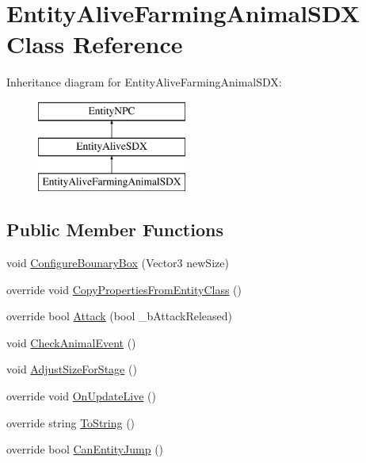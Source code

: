 \hypertarget{class_entity_alive_farming_animal_s_d_x}{}\section{Entity\+Alive\+Farming\+Animal\+S\+DX Class Reference}
\label{class_entity_alive_farming_animal_s_d_x}
Inheritance diagram for Entity\+Alive\+Farming\+Animal\+S\+DX\+:\begin{figure}[H]
\begin{center}
\leavevmode
\includegraphics[height=3.000000cm]{class_entity_alive_farming_animal_s_d_x}
\end{center}
\end{figure}
\subsection*{Public Member Functions}
\begin{DoxyCompactItemize}
\item 
void \mbox{\hyperlink{class_entity_alive_farming_animal_s_d_x_ab21718ff9ea7c49151c75dc1860be3ef}{Configure\+Bounary\+Box}} (Vector3 new\+Size)
\item 
override void \mbox{\hyperlink{class_entity_alive_farming_animal_s_d_x_a38ff8d31b3da26b1a179b4427610f880}{Copy\+Properties\+From\+Entity\+Class}} ()
\item 
override bool \mbox{\hyperlink{class_entity_alive_farming_animal_s_d_x_af1bff3e18731ed19c9435023f104c782}{Attack}} (bool \+\_\+b\+Attack\+Released)
\item 
void \mbox{\hyperlink{class_entity_alive_farming_animal_s_d_x_a13aff46204687873f3d4637585612d6e}{Check\+Animal\+Event}} ()
\item 
void \mbox{\hyperlink{class_entity_alive_farming_animal_s_d_x_a260d6bbf1a7d21fcf274e899b6347e44}{Adjust\+Size\+For\+Stage}} ()
\item 
override void \mbox{\hyperlink{class_entity_alive_farming_animal_s_d_x_a7beb1631a7f2d5b3e5a9967a4a2fcc55}{On\+Update\+Live}} ()
\item 
override string \mbox{\hyperlink{class_entity_alive_farming_animal_s_d_x_a0c73747ffe4df09009bd0b91c6262dab}{To\+String}} ()
\item 
override bool \mbox{\hyperlink{class_entity_alive_farming_animal_s_d_x_a30b47d85e719e776aae7f150e5dfe6c5}{Can\+Entity\+Jump}} ()
\end{DoxyCompactItemize}
